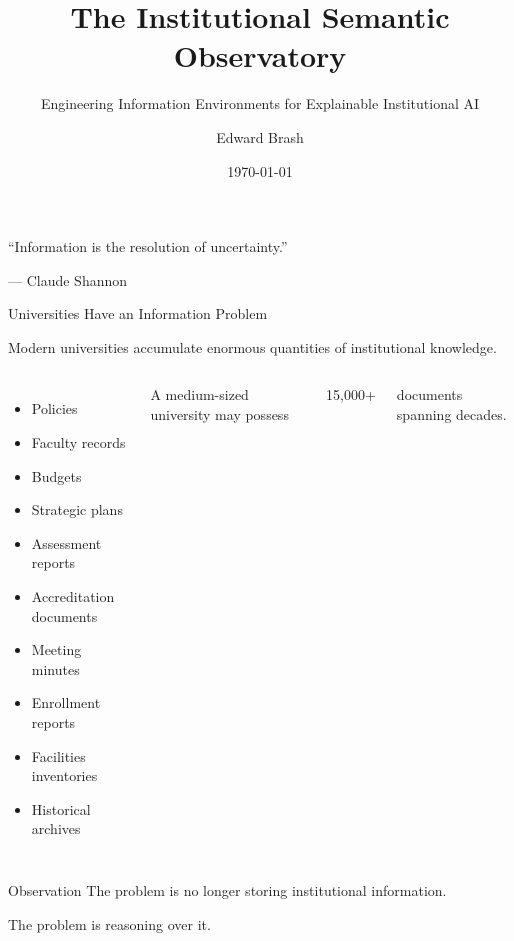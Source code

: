 \documentclass[aspectratio=169]{beamer}
\title{The Institutional Semantic Observatory}
\subtitle{Engineering Information Environments for Explainable Institutional AI}
\author{Edward Brash}
\institute{Christopher Newport University\\School of Engineering and Computing}
\date{\today}
\begin{document}

\begin{frame}
\titlepage

\vspace{0.4cm}

\centering
\small

``Information is the resolution of uncertainty.''

\vspace{0.15cm}

--- Claude Shannon
\end{frame}


\begin{frame}{Universities Have an Information Problem}

Modern universities accumulate enormous quantities of institutional
knowledge.

\vspace{0.4cm}

\begin{columns}[T]


\begin{itemize}
\item Policies
\item Faculty records
\item Budgets
\item Strategic plans
\item Assessment reports
\item Accreditation documents
\item Meeting minutes
\item Enrollment reports
\item Facilities inventories
\item Historical archives
\end{itemize}


\Large

A medium-sized university may possess

\vspace{0.3cm}

\centering
{\Huge 15,000+}

documents spanning decades.

\end{columns}

\vspace{0.5cm}

\begin{block}{Observation}
The problem is no longer storing institutional information.

The problem is reasoning over it.
\end{block}

\end{frame}
\end{document}
